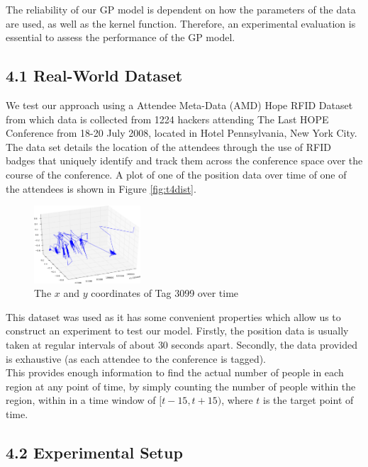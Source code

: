 \documentclass[letterpaper]{article}
\begin{document}
The reliability of our GP model is dependent on how the parameters of the data are used, as well as the kernel function. Therefore, an experimental evaluation is essential to assess the performance of the GP model.

\subsection{4.1  Real-World Dataset}

We test our approach using a Attendee Meta-Data (AMD) Hope RFID Dataset from which data is collected from 1224 hackers attending The Last HOPE Conference from 18-20 July 2008, located in Hotel Pennsylvania, New York City.\\

The data set details the location of the attendees through the use of RFID badges that uniquely identify and track them across the conference space over the course of the conference. A plot of one of the position data over time of one of the attendees is shown in Figure \ref{fig:t4dist}.\\

\begin{figure}[h!]
  \centering
    \includegraphics[width=150px,natwidth=675,natheight=493]{positiondata.png}
  \caption{The $x$ and $y$ coordinates of Tag 3099 over time}
  \label{fig:spaths}
\end{figure}

This dataset was used as it has some convenient properties which allow us to construct an experiment to test our model. Firstly, the position data is usually taken at regular intervals of about $30$ seconds apart. Secondly, the data provided is exhaustive (as each attendee to the conference is tagged). \\

This provides enough information to find the actual number of people in each region at any point of time, by simply counting the number of people within the region, within in a time window of $[t-15,t+15)$, where $t$ is the target point of time.

\subsection{4.2  Experimental Setup}
\end{document}
